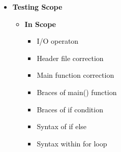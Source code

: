 \documentclass[12pt]{report}
\renewcommand{\_}{\kern-1.5pt\textunderscore\kern-1.5pt}
\begin{document}
\vspace{\baselineskip}
\begin{itemize}
	\item {\fontsize{14pt}{16.8pt}\selectfont \textbf{\textcolor[HTML]{0D0D0D}{Testing Scope}}\par}\par


\vspace{\baselineskip}
\begin{itemize}
	\item {\fontsize{13pt}{15.6pt}\selectfont \textbf{\textcolor[HTML]{0D0D0D}{In Scope}}\par}\par


\vspace{\baselineskip}\begin{itemize}
	\item {\fontsize{13pt}{15.6pt}\selectfont \textcolor[HTML]{0D0D0D}{I/O operaton}\par}\par

	\item {\fontsize{13pt}{15.6pt}\selectfont \textcolor[HTML]{0D0D0D}{Header file correction}\par}\par

	\item {\fontsize{13pt}{15.6pt}\selectfont \textcolor[HTML]{0D0D0D}{Main function correction}\par}\par

	\item {\fontsize{13pt}{15.6pt}\selectfont \textcolor[HTML]{0D0D0D}{Braces of main() function}\par}\par

	\item {\fontsize{13pt}{15.6pt}\selectfont \textcolor[HTML]{0D0D0D}{Braces of if condition}\par}\par

	\item {\fontsize{13pt}{15.6pt}\selectfont \textcolor[HTML]{0D0D0D}{Syntax of if else}\par}\par

	\item {\fontsize{13pt}{15.6pt}\selectfont \textcolor[HTML]{0D0D0D}{Syntax within for loop}\par}\par


\end{itemize}
\end{itemize}
\end{itemize}
\end{document}
